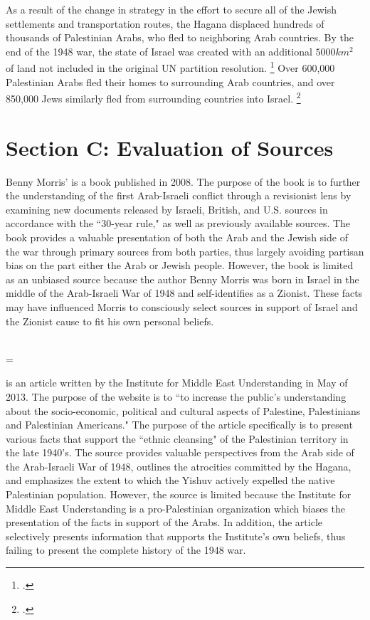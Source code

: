 \documentclass[12pt]{turabian-researchpaper}
\begin{document}
As a result of the change in strategy in the effort to secure all of the Jewish settlements and transportation routes, the Hagana displaced hundreds of thousands of Palestinian Arabs, who fled to neighboring Arab countries.  By the end of the 1948 war, the state of Israel was created with an additional $5000km^2$ of land not included in the original UN partition resolution.
\footcite{lorch}
Over 600,000 Palestinian Arabs fled their homes to surrounding Arab countries, and over 850,000 Jews similarly fled from surrounding countries into Israel.
\footcite{bartal}

\pagebreak
\section{Section C: Evaluation of Sources}
\noindent {}



Benny Morris'  is a book published in 2008.  The purpose of the book is to further the understanding of the first Arab-Israeli conflict through a revisionist lens by examining new documents released by Israeli, British, and U.S. sources in accordance with the ``30-year rule," as well as previously available sources.  The book provides a valuable presentation of both the Arab and the Jewish side of the war through primary sources from both parties, thus largely avoiding partisan bias on the part either the Arab or Jewish people.  However, the book is limited as an unbiased source because the author Benny Morris was born in Israel in the middle of the Arab-Israeli War of 1948 and self-identifies as a Zionist.  These facts may have influenced Morris to consciously select sources in support of Israel and the Zionist cause to fit his own personal beliefs.



~\\



\hangindent=\parindent \noindent {}



 is an article written by the Institute for Middle East Understanding in May of 2013.  The purpose of the website is to ``to increase the public's understanding about the socio-economic, political and cultural aspects of Palestine, Palestinians and Palestinian Americans."  The purpose of the article specifically is to present various facts that support the ``ethnic cleansing" of the Palestinian territory in the late 1940's.  The source provides valuable perspectives from the Arab side of the Arab-Israeli War of 1948, outlines the atrocities committed by the Hagana, and emphasizes the extent to which the Yishuv actively expelled the native Palestinian population.  However, the source is limited because the Institute for Middle East Understanding is a pro-Palestinian organization which biases the presentation of the facts in support of the Arabs.  In addition, the article selectively presents information that supports the Institute's own beliefs, thus failing to present the complete history of the 1948 war.
\end{document}
